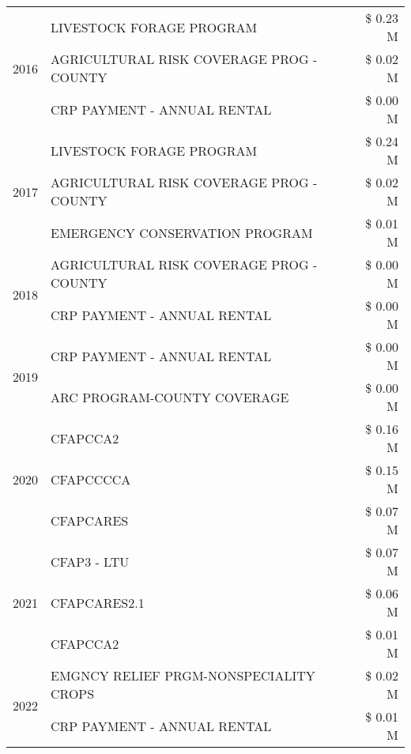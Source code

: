 \begin{tabular}{llr}
\cline{1-3}
\multirow[t]{3}{*}{2016} & LIVESTOCK FORAGE PROGRAM & \$ 0.23 M \\
 & AGRICULTURAL RISK COVERAGE PROG - COUNTY & \$ 0.02 M \\
 & CRP PAYMENT - ANNUAL RENTAL & \$ 0.00 M \\
\cline{1-3}
\multirow[t]{3}{*}{2017} & LIVESTOCK FORAGE PROGRAM & \$ 0.24 M \\
 & AGRICULTURAL RISK COVERAGE PROG - COUNTY & \$ 0.02 M \\
 & EMERGENCY CONSERVATION PROGRAM & \$ 0.01 M \\
\cline{1-3}
\multirow[t]{2}{*}{2018} & AGRICULTURAL RISK COVERAGE PROG - COUNTY & \$ 0.00 M \\
 & CRP PAYMENT - ANNUAL RENTAL & \$ 0.00 M \\
\cline{1-3}
\multirow[t]{2}{*}{2019} & CRP PAYMENT - ANNUAL RENTAL & \$ 0.00 M \\
 & ARC PROGRAM-COUNTY COVERAGE & \$ 0.00 M \\
\cline{1-3}
\multirow[t]{3}{*}{2020} & CFAPCCA2 & \$ 0.16 M \\
 & CFAPCCCCA & \$ 0.15 M \\
 & CFAPCARES & \$ 0.07 M \\
\cline{1-3}
\multirow[t]{3}{*}{2021} & CFAP3 - LTU & \$ 0.07 M \\
 & CFAPCARES2.1 & \$ 0.06 M \\
 & CFAPCCA2 & \$ 0.01 M \\
\cline{1-3}
\multirow[t]{2}{*}{2022} & EMGNCY RELIEF PRGM-NONSPECIALITY CROPS & \$ 0.02 M \\
 & CRP PAYMENT - ANNUAL RENTAL & \$ 0.01 M \\
\cline{1-3}
\bottomrule
\end{tabular}
